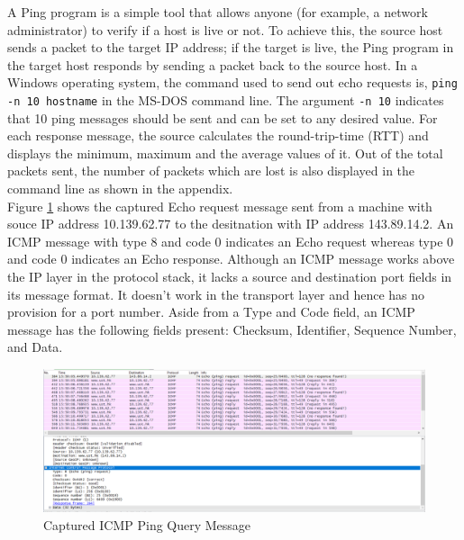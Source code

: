 \documentclass[10pt]{IEEEtran}
\begin{document}
 A Ping program is a simple tool that allows anyone (for example, a network administrator) to verify if a host is live or not. To achieve this, the source host sends a packet to the target IP address; if the target is live, the Ping program in the target host responds by sending a packet back to the source host. In a Windows operating system, the command used to send out echo requests is, {\tt ping -n 10 hostname} in the MS-DOS command line. The argument {\tt -n 10} indicates that 10 ping messages should be sent and can be set to any desired value. For each response message, the source calculates the round-trip-time (RTT) and displays the minimum, maximum and the average values of it. Out of the total packets sent, the number of packets which are lost is also displayed in the command line as shown in the appendix. \\
Figure \ref{fig:pingRequest} shows the captured Echo request message sent from a machine with souce IP address 10.139.62.77 to the desitnation with IP address 143.89.14.2. An ICMP message with type 8 and code 0 indicates an Echo request whereas type 0 and code 0 indicates an Echo response. Although an ICMP message works above the IP layer in the protocol stack, it lacks a source and destination port fields in its message format. It doesn't work in the transport layer and hence has no provision for a port number. Aside from a Type and Code field, an ICMP message has the following fields present: Checksum, Identifier, Sequence Number, and Data. \\

\begin{figure}[h!]
	\includegraphics[width=\linewidth]{Echo_request.png}
	\caption{Captured ICMP Ping Query Message}
	\label{fig:pingRequest}
\end{figure}
\end{document}
